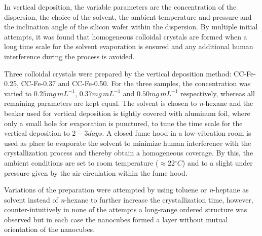 \documentclass[\main/dresen_thesis.tex]{subfiles}
\begin{document}
  \label{sec:colloidalCrystals:layers:preparation}
  In vertical deposition, the variable parameters are the concentration of the dispersion, the choice of the solvent, the ambient temperature and pressure and the inclination angle of the silicon wafer within the dispersion.
  By multiple initial attempts, it was found that homogeneous colloidal crystals are formed when a long time scale for the solvent evaporation is ensured and any additional human interference during the process is avoided.

  Three colloidal crystals were prepared by the vertical deposition method: CC-Fe-0.25, CC-Fe-0.37 and CC-Fe-0.50.
  For the three samples, the concentration was varied to $0.25 \unit{mg \, mL^{-1}}$, $0.37 \unit{mg \, mL^{-1}}$ and $0.50 \unit{mg \, mL^{-1}}$ respectively, whereas all remaining parameters are kept equal.
  The solvent is chosen to \textit{n}-hexane and the beaker used for vertical deposition is tightly covered with aluminum foil, where only a small hole for evaporation is punctured, to tune the time scale for the vertical deposition to $2 - 3 \unit{days}$.
  A closed fume hood in a low-vibration room is used as place to evaporate the solvent to minimize human interference with the crystallization process and thereby obtain a homogeneous coverage.
  By this, the ambient conditions are set to room temperature ($\approx 22\unit{^\circ C}$) and to a slight under pressure given by the air circulation within the fume hood.

  Variations of the preparation were attempted by using toluene or \textit{n}-heptane as solvent instead of \textit{n}-hexane to further increase the crystallization time, however, counter-intuitively in none of the attempts a long-range ordered structure was observed but in each case the nanocubes formed a layer without mutual orientation of the nanocubes.
\end{document}
